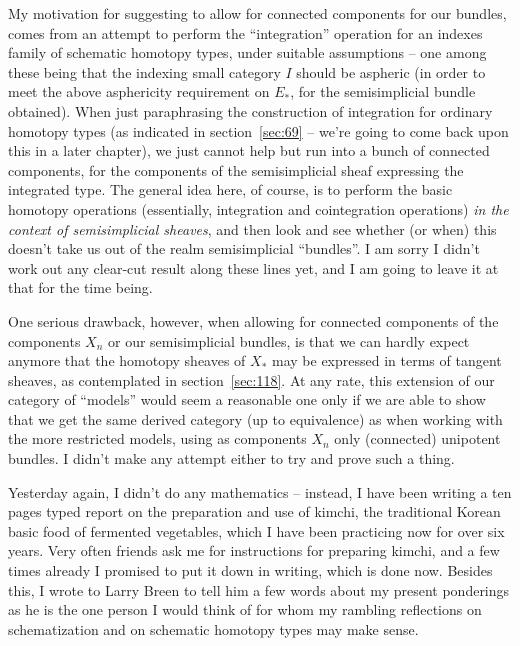 My motivation for suggesting to allow for connected components for our
bundles, comes from an attempt to perform the ``integration''
operation for an indexes family of schematic homotopy types, under
suitable assumptions -- one among these being that the indexing small
category $I$ should be aspheric (in order to meet the above
asphericity requirement on $E_*$, for the semisimplicial bundle
obtained). When just paraphrasing the construction of integration for
ordinary homotopy types (as indicated in section~\ref{sec:69} -- we're
going to come back upon this in a later chapter), we just cannot help
but run into a bunch of connected components, for the components of
the semisimplicial sheaf expressing the integrated type. The general
idea here, of course, is to perform the basic homotopy operations
(essentially, integration and cointegration operations) \emph{in the
  context of semisimplicial sheaves}, and then look and see whether
(or when) this doesn't take us out of the realm semisimplicial
``bundles''. I am sorry I didn't work out any clear-cut result along
these lines yet, and I am going to leave it at that for the time
being.

One serious drawback, however, when allowing for connected components
of the components $X_n$ or our semisimplicial bundles, is that we can
hardly expect anymore that the homotopy sheaves of $X_*$ may be
expressed in terms of tangent sheaves, as contemplated in
section~\ref{sec:118}. At any rate, this extension of our category of
``models'' would seem a reasonable one only if we are able to show
that we get the same derived category (up to equivalence) as when
working with the more restricted models, using as components $X_n$
only (connected) unipotent bundles. I didn't make any attempt either
to try and prove such a thing.

\noindent\hfill{}\par

\label{sec:131}%
Yesterday again, I didn't do any mathematics -- instead, I have been
writing a ten pages typed report on the preparation and use of kimchi,
the traditional Korean basic food of fermented vegetables, which I
have been practicing now for over six years. Very often friends ask me
for instructions for preparing kimchi, and a few times already I
promised to put it down in writing, which is done now. Besides this, I
wrote to Larry Breen to tell him a few words about my present
ponderings as he is the one person I would think of for whom my
rambling reflections on schematization and on schematic
homotopy types may make sense.

